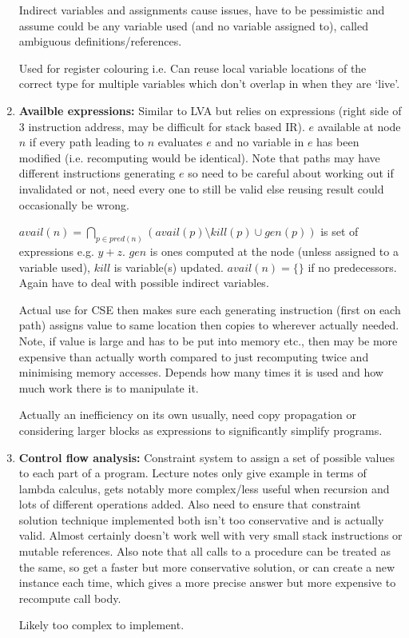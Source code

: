 \documentclass[10pt,twoside,a4paper]{article}
\begin{document}
\begin{enumerate}
Indirect variables and assignments cause issues, have to be pessimistic and assume could be any variable used (and no variable assigned to), called ambiguous definitions/references.

Used for register colouring i.e. Can reuse local variable locations of the correct type for multiple variables which don't overlap in when they are `live'.

\item \textbf{Availble expressions: }Similar to LVA but relies on expressions (right side of 3 instruction address, may be difficult for stack based IR). $e$ available at node $n$ if every path leading to $n$ evaluates $e$ and no variable in $e$ has been modified (i.e. recomputing would be identical). Note that paths may have different instructions generating $e$ so need to be careful about working out if invalidated or not, need every one to still be valid else reusing result could occasionally be wrong. 

$avail(n) = \bigcap_{p \in pred(n)} \left(avail(p) \setminus kill(p) \cup gen(p) \right)$ is set of expressions e.g. $y + z$. $gen$ is ones computed at the node (unless assigned to a variable used), $kill$ is variable(s) updated. $avail(n) = \{\}$ if no predecessors. Again have to deal with possible indirect variables. 

Actual use for CSE then makes sure each generating instruction (first on each path) assigns value to same location then copies to wherever actually needed. Note, if value is large and has to be put into memory etc., then may be more expensive than actually worth compared to just recomputing twice and minimising memory accesses. Depends how many times it is used and how much work there is to manipulate it. 

Actually an inefficiency on its own usually, need copy propagation or considering larger blocks as expressions to significantly simplify programs. 

\item \textbf{Control flow analysis: } Constraint system to assign a set of possible values to each part of a program. Lecture notes only give example in terms of lambda calculus, gets notably more complex/less useful when recursion and lots of different operations added. Also need to ensure that constraint solution technique implemented both isn't too conservative and is actually valid. Almost certainly doesn't work well with very small stack instructions or mutable references. Also note that all calls to a procedure can be treated as the same, so get a faster but more conservative solution, or can create a new instance each time, which gives a more precise answer but more expensive to recompute call body.

Likely too complex to implement.
\end{enumerate}
\end{document}
